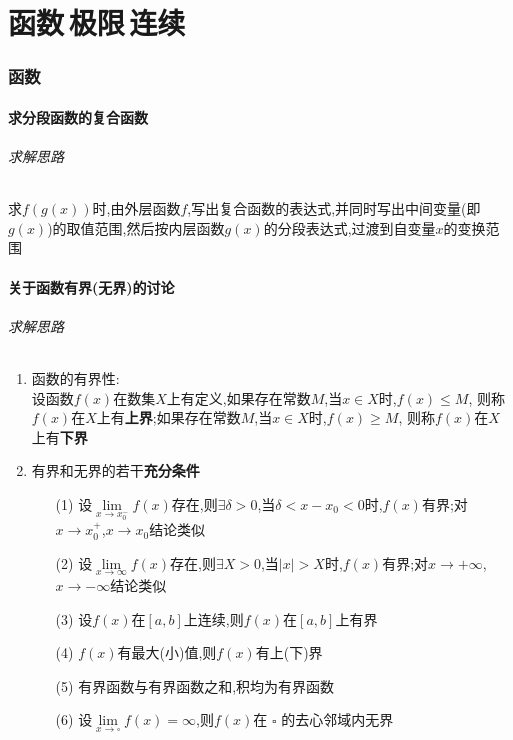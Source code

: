 \part{函数\,极限\,连续}
\section{函数}
\subsection{求分段函数的复合函数}
\paragraph{求解思路}
求$f(g(x))$时,由外层函数$f$,写出复合函数的表达式,并同时写出中间变量(即$g(x)$)的取值范围,然后按内层函数$g(x)$的分段表达式,过渡到自变量$x$的变换范围
\subsection{关于函数有界(无界)的讨论}
\paragraph{求解思路}
\begin{enumerate}
    \item  
            函数的有界性: \\ 设函数$f(x)$在数集$X$上有定义,如果存在常数$M$,当$x \in X$时,$f(x) \leq M$, 则称$f(x)$在$X$上有\textbf{上界};如果存在常数$M$,当$x \in X$时,$f(x) \geq M$, 则称$f(x)$在$X$上有\textbf{下界}
    \item
        有界和无界的若干\textbf{充分条件} \\
        \begin{enumerate}
            \item[(1)] 设$\lim\limits_{x\rightarrow x_0^-}f(x)$存在,则$ \exists\delta> 0$,当\mbox{$\delta < x - x_0 < 0$}时,$f(x)$有界;对\mbox{$x\rightarrow x_0^+$},\mbox{$x\rightarrow x_0$}结论类似
            \item[(2)] 设$\lim\limits_{x\rightarrow\infty}f(x)$存在,则$ \exists X> 0$,当$|x| > X$时,$f(x)$有界;对$x\rightarrow +\infty$,\mbox{$x\rightarrow -\infty$}结论类似
            \item[(3)] 设$f(x)$在\textbf{$[a,b]$}上连续,则$f(x)$在$[a,b]$上有界
            \item[(4)] $f(x)$有最大(小)值,则$f(x)$有上(下)界
            \item[(5)] 有界函数与有界函数之和,积均为有界函数
            \item[(6)] 设$\lim\limits_{x\rightarrow\square}f(x) = \infty$,则$f(x)$在 $\square$ 的去心邻域内无界
        \end{enumerate}
\end{enumerate}
\newpage
